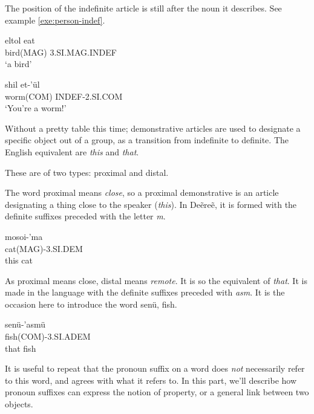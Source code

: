 The position of the indefinite article is still after the noun it describes. See example
\ref{exe:person-indef}.

\begin{exe}
\ex\label{exe:person-indef}
\begin{xlist}
\ex\gll \gls{eltol} eat\\
bird(MAG) 3.SI.MAG.INDEF\\
\trans ‘a bird’

\ex\gll {}\gls{shil} et-’ül\\
worm(COM) INDEF-2.SI.COM\\
\trans ‘You’re a worm!’
\end{xlist}
\end{exe}

Without a pretty table this time; demonstrative articles are used to designate a specific object out
of a group, as a transition from indefinite to definite. The English equivalent are \emph{this} and
\emph{that}.

These are of two types: proximal and distal.

The word proximal means \emph{close}, so a proximal demonstrative is an article designating a thing
close to the speaker (\emph{this}). In Deẽreẽ, it is formed with the definite suffixes preceded with
the letter \emph{m}.

\begin{exe}
\ex\label{exe:person-prox-dem}
\gll mosoi-’ma\\
cat(MAG)-3.SI.DEM\\
\trans this cat
\end{exe}

As proximal means close, distal means \emph{remote}. It is so the equivalent of \emph{that}. It is
made in the language with the definite suffixes preceded with \emph{asm}. It is the occasion here to
introduce the word \gls{senü}, fish.

\begin{exe}
\ex\label{exe:person-dist-dem}
\gll \gls{senü}-’asmü\\
fish(COM)-3.SI.ADEM\\
\trans that fish
\end{exe}

It is useful to repeat that the pronoun suffix on a word does \emph{not} necessarily refer to this
word, and agrees with what it refers to. In this part, we’ll describe how pronoun suffixes can
express the notion of property, or a general link between two objects.


